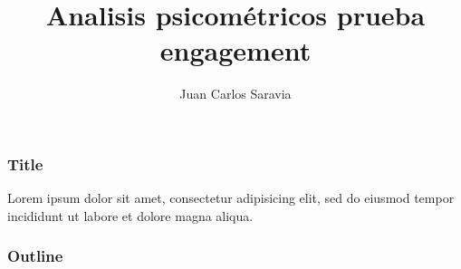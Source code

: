 \documentclass{beamer}
\title{Analisis psicométricos prueba engagement}
\author{Juan Carlos Saravia}
\begin{document}
\begin{frame}
\titlepage
\end{frame}

\begin{frame}
\frametitle{Title}
Lorem ipsum dolor sit amet, consectetur adipisicing elit, sed do eiusmod tempor incididunt ut labore et dolore magna aliqua.
\end{frame}

\begin{frame}
\frametitle{Outline}
\tableofcontents
\end{frame}
\end{document}
